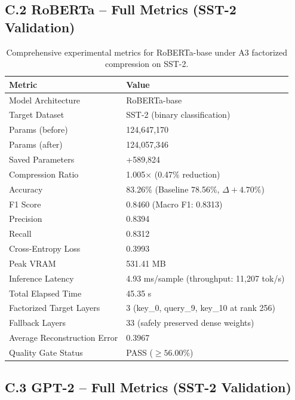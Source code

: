 \subsection{C.2 RoBERTa -- Full Metrics (SST-2 Validation)}

\begin{table}[H]
\centering
\small
\begin{tabular}{ll}
\toprule
\textbf{Metric} & \textbf{Value} \\
\midrule
Model Architecture & RoBERTa-base \\
Target Dataset & SST-2 (binary classification) \\
Params (before) & 124,647,170 \\
Params (after) & 124,057,346 \\
Saved Parameters & +589,824 \\
Compression Ratio & 1.005$\times$ (0.47\% reduction) \\
Accuracy & 83.26\% (Baseline 78.56\%, $\Delta +4.70\%$) \\
F1 Score & 0.8460 (Macro F1: 0.8313) \\
Precision & 0.8394 \\
Recall & 0.8312 \\
Cross-Entropy Loss & 0.3993 \\
Peak VRAM & 531.41 MB \\
Inference Latency & 4.93 ms/sample (throughput: 11,207 tok/s) \\
Total Elapsed Time & 45.35 s \\
Factorized Target Layers & 3 (key\_0, query\_9, key\_10 at rank 256) \\
Fallback Layers & 33 (safely preserved dense weights) \\
Average Reconstruction Error & 0.3967 \\
Quality Gate Status & PASS ($\ge 56.00\%$) \\
\bottomrule
\end{tabular}
\caption{Comprehensive experimental metrics for RoBERTa-base under A3 factorized compression on SST-2.}
\label{tab:roberta_full_metrics}
\end{table}

\subsection{C.3 GPT-2 -- Full Metrics (SST-2 Validation)}

